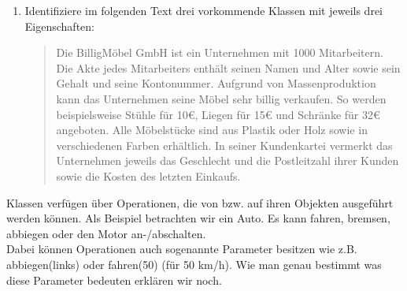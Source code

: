 \begin{enumerate}
    \item Identifiziere im folgenden Text drei vorkommende Klassen mit jeweils drei Eigenschaften:

    \begin{quotation}
    Die BilligMöbel GmbH ist ein Unternehmen mit 1000 Mitarbeitern.
    Die Akte jedes Mitarbeiters enthält seinen Namen und Alter sowie sein Gehalt und seine Kontonummer.
    Aufgrund von Massenproduktion kann das Unternehmen seine Möbel sehr billig verkaufen.
    So werden beispielsweise Stühle für 10€, Liegen für 15€ und Schränke für 32€ angeboten.
    Alle Möbelstücke sind aus Plastik oder Holz sowie in verschiedenen Farben erhältlich.
    In seiner Kundenkartei vermerkt das Unternehmen jeweils das Geschlecht und die Postleitzahl ihrer Kunden sowie die Kosten des letzten Einkaufs.
    \end{quotation}
\end{enumerate}

\begin{Infobox}
    Klassen verfügen über Operationen, die von bzw. auf ihren Objekten ausgeführt werden können.
    Als Beispiel betrachten wir ein Auto. Es kann fahren, bremsen, abbiegen oder den Motor an-/abschalten.\\

    Dabei können Operationen auch sogenannte Parameter besitzen wie z.B. abbiegen(links) oder fahren(50) (für 50 km/h).
    Wie man genau bestimmt was diese Parameter bedeuten erklären wir noch.
\end{Infobox}

